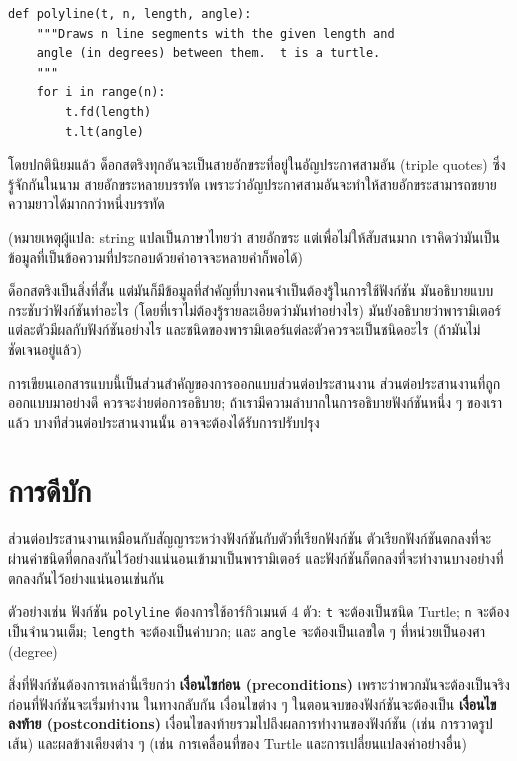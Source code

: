 \begin{verbatim}
def polyline(t, n, length, angle):
    """Draws n line segments with the given length and
    angle (in degrees) between them.  t is a turtle.
    """    
    for i in range(n):
        t.fd(length)
        t.lt(angle)
\end{verbatim}
%
โดยปกตินิยมแล้ว ด็อกสตริงทุกอันจะเป็นสายอักขระที่อยู่ในอัญประกาศสามอัน (triple quotes)  ซึ่งรู้จักกันในนาม 
สายอักขระหลายบรรทัด เพราะว่าอัญประกาศสามอันจะทำให้สายอักขระสามารถขยายความยาวได้มากกว่าหนึ่งบรรทัด

(หมายเหตุผู้แปล: string แปลเป็นภาษาไทยว่า สายอักขระ แต่เพื่อไม่ให้สับสนมาก เราคิดว่ามันเป็นข้อมูลที่เป็นข้อความที่ประกอบด้วยคำอาจจะหลายคำก็พอได้)

ด็อกสตริงเป็นสิ่งที่สั้น แต่มันก็มีข้อมูลที่สำคัญที่บางคนจำเป็นต้องรู้ในการใช้ฟังก์ชัน มันอธิบายแบบกระชับว่าฟังก์ชันทำอะไร (โดยที่เราไม่ต้องรู้รายละเอียดว่ามันทำอย่างไร) มันยังอธิบายว่าพารามิเตอร์แต่ละตัวมีผลกับฟังก์ชันอย่างไร และชนิดของพารามิเตอร์แต่ละตัวควรจะเป็นชนิดอะไร (ถ้ามันไม่ชัดเจนอยู่แล้ว)

การเขียนเอกสารแบบนี้เป็นส่วนสำคัญของการออกแบบส่วนต่อประสานงาน ส่วนต่อประสานงานที่ถูกออกแบบมาอย่างดี
ควรจะง่ายต่อการอธิบาย; ถ้าเรามีความลำบากในการอธิบายฟังก์ชันหนึ่ง ๆ ของเราแล้ว บางทีส่วนต่อประสานงานนั้น
อาจจะต้องได้รับการปรับปรุง


\section{การดีบัก}

ส่วนต่อประสานงานเหมือนกับสัญญาระหว่างฟังก์ชันกับตัวที่เรียกฟังก์ชัน
ตัวเรียกฟังก์ชันตกลงที่จะผ่านค่าชนิดที่ตกลงกันไว้อย่างแน่นอนเข้ามาเป็นพารามิเตอร์ และฟังก์ชันก็ตกลงที่จะทำงานบางอย่างที่ตกลงกันไว้อย่างแน่นอนเช่นกัน

ตัวอย่างเช่น ฟังก์ชัน {\tt polyline} ต้องการใช้อาร์กิวเมนต์ 4 ตัว: {\tt t} จะต้องเป็นชนิด Turtle; 
{\tt n} จะต้องเป็นจำนวนเต็ม; {\tt length} จะต้องเป็นค่าบวก; และ {\tt angle} จะต้องเป็นเลขใด ๆ 
ที่หน่วยเป็นองศา (degree)

สิ่งที่ฟังก์ชันต้องการเหล่านี้เรียกว่า {\bf เงื่อนไขก่อน (preconditions)} เพราะว่าพวกมันจะต้องเป็นจริงก่อนที่ฟังก์ชันจะเริ่มทำงาน  ในทางกลับกัน เงื่อนไขต่าง ๆ ในตอนจบของฟังก์ชันจะต้องเป็น {\bf เงื่อนไขลงท้าย (postconditions)} 
เงื่อนไขลงท้ายรวมไปถึงผลการทำงานของฟังก์ชัน (เช่น การวาดรูปเส้น) และผลข้างเคียงต่าง ๆ (เช่น การเคลื่อนที่ของ 
Turtle และการเปลี่ยนแปลงค่าอย่างอื่น) 

